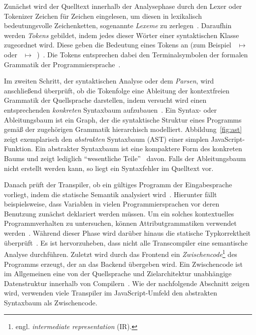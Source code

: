 Zunächst wird der Quelltext innerhalb der Analysephase durch den Lexer oder Tokenizer Zeichen für Zeichen eingelesen, um diesen in lexikalisch bedeutungsvolle Zeichenketten, sogenannte \emph{Lexeme} zu zerlegen~\autocite[43]{AHO:COMPILERS}. Daraufhin werden \emph{Tokens} gebildet, indem jedes dieser Wörter einer syntaktischen Klasse zugeordnet wird. Diese geben die Bedeutung eines Tokens an (zum Beispiel ~$\mapsto$~ oder \code{!=}~$\mapsto$~)~\autocite[26]{TORCZON:2007}. Die Tokens entsprechen dabei den Terminalsymbolen der formalen Grammatik der Programmiersprache~\autocite[43]{AHO:COMPILERS}.

Im zweiten Schritt, der syntaktischen Analyse oder dem \emph{Parsen}, wird anschließend überprüft, ob die Tokenfolge eine Ableitung der kontextfreien Grammatik der Quellsprache darstellen, indem versucht wird einen entsprechenden \emph{konkreten} Syntaxbaum aufzubauen~\autocite{SCHOEPP:COMPILER}. Ein Syntax- oder Ableitungsbaum ist ein Graph, der die syntaktische Struktur eines Programms gemäß der zugehörigen Grammatik hierarchisch modelliert. Abbildung~\ref{fig:ast} zeigt exemplarisch den \emph{abstrakten} Syntaxbaum (AST) einer simplen JavaScript-Funktion. Ein abstrakter Syntaxbaum ist eine kompaktere Form des konkreten Baums und zeigt lediglich \enquote{wesentliche Teile}~\autocite[21]{WALDMANN:PPS} davon. Falls der Ableitungsbaum nicht erstellt werden kann, so liegt ein Syntaxfehler im Quelltext vor.

Danach prüft der Transpiler, ob ein gültiges Programm der Eingabesprache vorliegt, indem die statische Semantik analysiert wird~\autocite[8]{AHO:COMPILERS}. Hierunter fällt beispielsweise, dass Variablen in vielen Programmiersprachen vor deren Benutzung zunächst deklariert werden müssen. Um ein solches kontextuelles Programmverhalten zu untersuchen, können Attributgrammatiken verwendet werden~\autocite[161]{TORCZON:2007}. Während dieser Phase wird darüber hinaus die statische Typkorrektheit überprüft~\autocite{SCHOEPP:COMPILER}. Es ist hervorzuheben, dass nicht alle Transcompiler eine semantische Analyse durchführen.
Zuletzt wird durch das Frontend ein \emph{Zwischencode}\footnote{engl. \textit{intermediate representation} (IR).} des Programms erzeugt, der an das Backend übergeben wird. Ein Zwischencode ist im Allgemeinen eine von der Quellsprache und Zielarchitektur unabhängige Datenstruktur innerhalb von Compilern~\autocite[6]{TORCZON:2007}. Wie der nachfolgende Abschnitt zeigen wird, verwenden viele Transpiler im JavaScript-Umfeld den abstrakten Syntaxbaum als Zwischencode.

